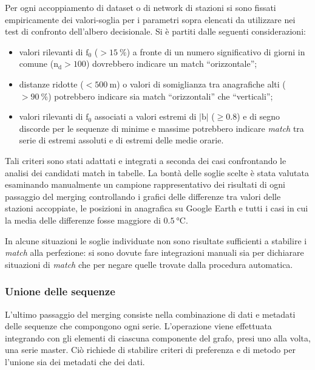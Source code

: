 Per ogni accoppiamento di dataset o di network di stazioni si sono fissati empiricamente dei valori-soglia per i parametri sopra elencati da utilizzare nei test di confronto dell'albero decisionale. Si è partiti dalle seguenti considerazioni:

\begin{itemize}
  \item
    valori rilevanti di \(\mathrm{f}_0\) (\(> \qty{15}{\percent}\)) a fronte di un numero significativo di giorni in comune (\(\mathrm{n_d} > 100\)) dovrebbero indicare un match ``orizzontale'';
  \item
    distanze ridotte (\(< 500\:\mathrm{m}\)) o valori di somiglianza tra anagrafiche alti (\(> \qty{90}{\percent}\)) potrebbero indicare sia match ``orizzontali'' che ``verticali'';
  \item
    valori rilevanti di \(\mathrm{f}_0\) associati a valori estremi di \(|\mathrm{b}|\) (\(\ge 0.8\)) e di segno discorde per le sequenze di minime e massime potrebbero indicare \emph{match} tra serie di estremi assoluti e di estremi delle medie orarie.
\end{itemize}

Tali criteri sono stati adattati e integrati a seconda dei casi confrontando le analisi dei candidati match in tabelle. La bontà delle soglie scelte è stata valutata esaminando manualmente un campione rappresentativo dei risultati di ogni passaggio del merging controllando i grafici delle differenze tra valori delle stazioni accoppiate, le posizioni in anagrafica su Google Earth e tutti i casi in cui la media delle differenze fosse maggiore di \(\qty{0.5}{\degreeCelsius}\).

In alcune situazioni le soglie individuate non sono risultate sufficienti a stabilire i \emph{match} alla perfezione: si sono dovute fare integrazioni manuali sia per dichiarare situazioni di \emph{match} che per negare quelle trovate dalla procedura automatica.

\subsubsection{Unione delle sequenze}
L'ultimo passaggio del merging consiste nella combinazione di dati e metadati delle sequenze che compongono ogni serie. L'operazione viene effettuata integrando con gli elementi di ciascuna componente del grafo, presi uno alla volta, una serie master. Ciò richiede di stabilire criteri di preferenza e di metodo per l'unione sia dei metadati che dei dati.

